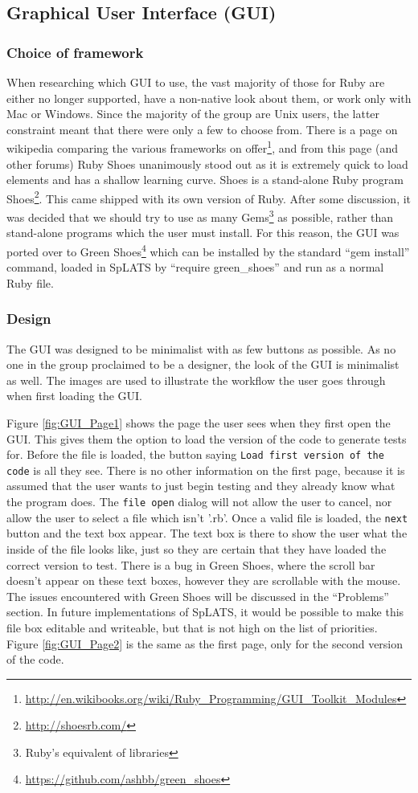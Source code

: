   \subsection{Graphical User Interface (GUI)}
  \subsubsection{Choice of framework}
  When researching which GUI to use, the vast majority of those for Ruby are either no longer supported, have a non-native look about them, or work only with Mac or Windows. Since the majority of the group are Unix users, the latter constraint meant that there were only a few to choose from. There is a page on wikipedia comparing the various frameworks on offer\footnote{\url{http://en.wikibooks.org/wiki/Ruby_Programming/GUI_Toolkit_Modules}}, and from this page (and other forums) Ruby Shoes unanimously stood out as it is extremely quick to load elements and has a shallow learning curve.
  Shoes is a stand-alone Ruby program Shoes\footnote{\url{http://shoesrb.com/}}. This came shipped with its own version of Ruby. After some discussion, it was decided that we should try to use as many Gems\footnote{Ruby's equivalent of libraries} as possible, rather than stand-alone programs which the user must install. For this reason, the GUI was ported over to Green Shoes\footnote{\url{https://github.com/ashbb/green_shoes}} which can be installed by the standard ``gem install'' command, loaded in SpLATS by ``require green\_shoes'' and run as a normal Ruby file.
  
  \subsubsection{Design}
  The GUI was designed to be minimalist with as few buttons as possible. As no one in the group proclaimed to be a designer, the look of the GUI is minimalist as well. The images are used to illustrate the workflow the user goes through when first loading the GUI.
  
  Figure \ref{fig:GUI_Page1} shows the page the user sees when they first open the GUI. This gives them the option to load the version of the code to generate tests for. Before the file is loaded, the button saying \verb+Load first version of the code+ is all they see. There is no other information on the first page, because it is assumed that the user wants to just begin testing and they already know what the program does. The \verb+file open+ dialog will not allow the user to cancel, nor allow the user to select a file which isn't '.rb'. Once a valid file is loaded, the \verb+next+ button and the text box appear. The text box is there to show the user what the inside of the file looks like, just so they are certain that they have loaded the correct version to test. There is a bug in Green Shoes, where the scroll bar doesn't appear on these text boxes, however they are scrollable with the mouse. The issues encountered with Green Shoes will be discussed in the ``Problems'' section. In future implementations of SpLATS, it would be possible to make this file box editable and writeable, but that is not high on the list of priorities.
Figure \ref{fig:GUI_Page2} is the same as the first page, only for the second version of the code.
  
